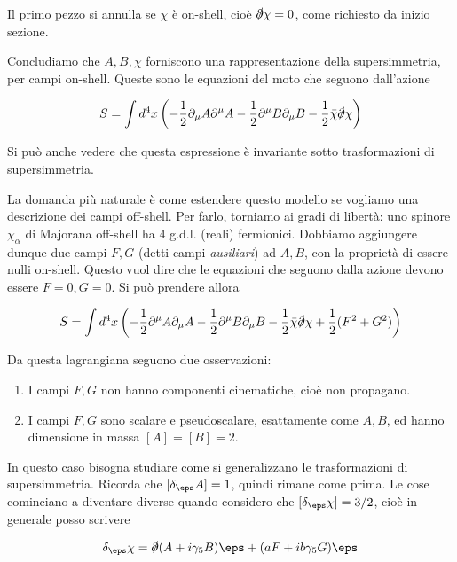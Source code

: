 \documentclass{report}
\begin{document}
Il primo pezzo si annulla se \(\chi\) è on-shell, cioè \(\slashed{\partial}\chi = 0\), come richiesto da inizio sezione. 

Concludiamo che \(A, B, \chi\) forniscono una rappresentazione della supersimmetria, per campi on-shell. Queste sono le equazioni del moto che seguono dall'azione 

\begin{align}
    S = \int d^4x \left(-\frac{1}{2}\partial_\mu A \partial^\mu A - \frac{1}{2}\partial^\mu B \partial_\mu B -\frac{1}{2}\bar{\chi}\slashed{\partial}\chi\right)
\end{align}

Si può anche vedere che questa espressione è invariante sotto trasformazioni di supersimmetria. 

La domanda più naturale è come estendere questo modello se vogliamo una descrizione dei campi off-shell. Per farlo, torniamo ai gradi di libertà: uno spinore \(\chi_\alpha\) di Majorana off-shell ha 4 g.d.l. (reali) fermionici. Dobbiamo aggiungere dunque due campi \(F, G\) (detti campi \emph{ausiliari}) ad \(A, B\), con la proprietà di essere nulli on-shell. Questo vuol dire che le equazioni che seguono dalla azione devono essere \(F =0, G=0\). Si può prendere allora 

\begin{align}
    S = \int d^4x \left(-\frac{1}{2}\partial^\mu A \partial_\mu A - \frac{1}{2}\partial^\mu B \partial_\mu B -\frac{1}{2}\bar{\chi}\slashed{\partial}\chi + \frac{1}{2}(F^2 + G^2) \right)
\end{align}

Da questa lagrangiana seguono due osservazioni: 
\begin{enumerate}
    \item I campi \(F, G\) non hanno componenti cinematiche, cioè non propagano. 
    \item I campi \(F, G\) sono scalare e pseudoscalare, esattamente come \(A, B\), ed hanno dimensione in massa \([A] = [B] = 2\). 
\end{enumerate}

In questo caso bisogna studiare come si generalizzano le trasformazioni di supersimmetria. Ricorda che \([\delta_\eps A] = 1\), quindi rimane come prima. Le cose cominciano a diventare diverse quando considero che \([\delta_\eps \chi] = 3/2\), cioè in generale posso scrivere 

\begin{align}
    \delta_\eps \chi = \slashed{\partial}(A+i\gamma_5 B)\eps + (aF + ib\gamma_5 G)\eps
\end{align}
\end{document}
